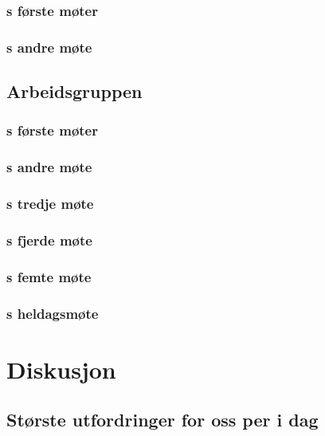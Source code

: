 \documentclass[11pt]{report} %
\begin{document}
    \subsection{s første møter}\label{sec:stygr_1}
    

    \subsection{s andre møte}\label{sec:stygr_2}
 
  \section{Arbeidsgruppen}\label{sec:m_agr}
    \subsection{s første møter}\label{sec:agr_1}
    \subsection{s andre møte}\label{sec:agr_2}
    \subsection{s tredje møte}\label{sec:agr_3}
    \subsection{s fjerde møte}\label{sec:agr_4}
    \subsection{s femte møte}\label{sec:agr_5}
    \subsection{s heldagsmøte}\label{sec:agr_6}
      

\chapter{Diskusjon}\label{chap:disk}
  \section{Største utfordringer for oss per i dag} \label{chap:disk_utf}
\end{document}
